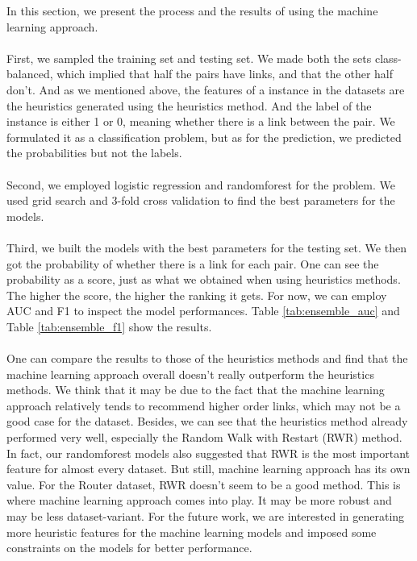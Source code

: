 \documentclass[12pt]{article}
\begin{document}
In this section, we present the process and the results of using the machine learning approach. 
\\
\\
First, we sampled the training set and testing set. We made both the sets class-balanced, which implied that half the pairs have links, and that the other half don't. And as we mentioned above, the features of a instance in the datasets are the heuristics generated using the heuristics method. And the label of the instance is either 1 or 0, meaning whether there is a link between the pair. We formulated it as a classification problem, but as for the prediction, we predicted the probabilities but not the labels. 
\\
\\
Second, we employed logistic regression and randomforest for the problem. We used grid search and 3-fold cross validation to find the best parameters for the models.
\\
\\
Third, we built the models with the best parameters for the testing set. We then got the probability of whether there is a link for each pair. One can see the probability as a score, just as what we obtained when using heuristics methods. The higher the score, the higher the ranking it gets. For now, we can employ AUC and F1 to inspect the model performances. Table \ref{tab:ensemble_auc} and Table \ref{tab:ensemble_f1} show the results.
\\
\\
One can compare the results to those of the heuristics methods and find that the machine learning approach overall doesn't really outperform the heuristics methods. We think that it may be due to the fact that the machine learning approach relatively tends to recommend higher order links, which may not be a good case for the dataset. Besides, we can see that the heuristics method already performed very well, especially the Random Walk with Restart (RWR) method. In fact, our randomforest models also suggested that RWR is the most important feature for almost every dataset. But still, machine learning approach has its own value. For the Router dataset, RWR doesn't seem to be a good method. This is where machine learning approach comes into play. It may be more robust and may be less dataset-variant. For the future work, we are interested in generating more heuristic features for the machine learning models and imposed some constraints on the models for better performance. 
\end{document}
